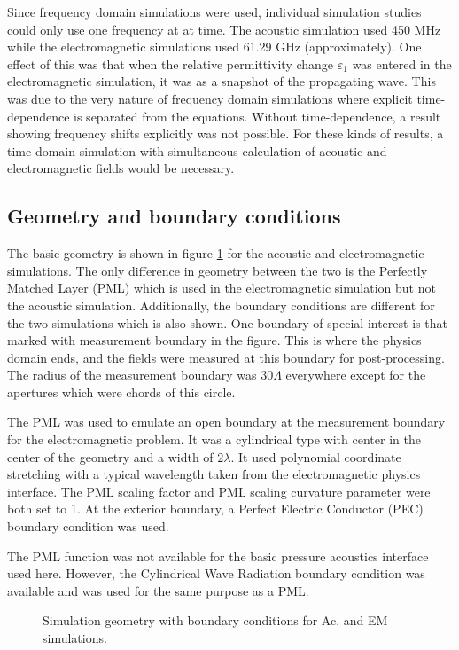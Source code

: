 \documentclass[11pt,twoside]{eitExjobb}
\begin{document}
	Since frequency domain simulations were used, individual simulation studies could only use one frequency at at time. The acoustic simulation used 450 MHz while the electromagnetic simulations used 61.29 GHz (approximately). One effect of this was that when the relative permittivity change $\varepsilon_1$ was entered in the electromagnetic simulation, it was as a snapshot of the propagating wave. This was due to the very nature of frequency domain simulations where explicit time-dependence is separated from the equations. Without time-dependence, a result showing frequency shifts explicitly was not possible. For these kinds of results, a time-domain simulation with simultaneous calculation of acoustic and electromagnetic fields would be necessary.
	
	\subsection{Geometry and boundary conditions}
	The basic geometry is shown in figure \ref{fig:sim-geometry} for the acoustic and electromagnetic simulations. The only difference in geometry between the two is the Perfectly Matched Layer (PML) which is used in the electromagnetic simulation but not the acoustic simulation. Additionally, the boundary conditions are different for the two simulations which is also shown. One boundary of special interest is that marked with measurement boundary in the figure. This is where the physics domain ends, and the fields were measured at this boundary for post-processing. The radius of the measurement boundary was $30\Lambda$ everywhere except for the apertures which were chords of this circle.
	
	The PML was used to emulate an open boundary at the measurement boundary for the electromagnetic problem. It was a cylindrical type with center in the center of the geometry and a width of $2\lambda$. It used polynomial coordinate stretching with a typical wavelength taken from the electromagnetic physics interface. The PML scaling factor and PML scaling curvature parameter were both set to 1. At the exterior boundary, a Perfect Electric Conductor (PEC) boundary condition was used.
	
	The PML function was not available for the basic pressure acoustics interface used here. However, the Cylindrical Wave Radiation boundary condition was available and was used for the same purpose as a PML.
	
	\begin{figure}
		\centering
		
		\vspace{5 mm}
		
		
		\caption{\label{fig:sim-geometry} Simulation geometry with boundary conditions for Ac. and EM simulations.}
	\end{figure}
	
\end{document}
